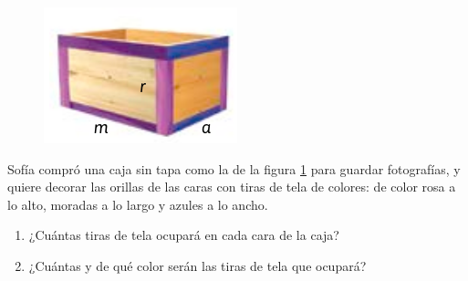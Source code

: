 \documentclass[11pt]{book}
\begin{document}
\begin{enumerate}
  \begin{minipage}[t]{.2\textwidth}
    \begin{figure}[H]
      \centering
      \includegraphics[width=\linewidth]{caja.png}
      \label{fig:caja}
    \end{figure}
  \end{minipage}\hfill
  \begin{minipage}[t]{.7\textwidth}
    \item Sofía compró una caja sin tapa como la de la figura \ref{fig:caja} para guardar fotografías,
    y quiere decorar las orillas de las caras con tiras de tela de colores: de color rosa
    a lo alto, moradas a lo largo y azules a lo ancho.

    \begin{enumerate}
      \item ¿Cuántas tiras de tela ocupará en cada cara de la caja?
      \item ¿Cuántas y de qué color serán las tiras de tela que ocupará?
    \end{enumerate}
  \end{minipage}


\end{enumerate}
\end{document}
